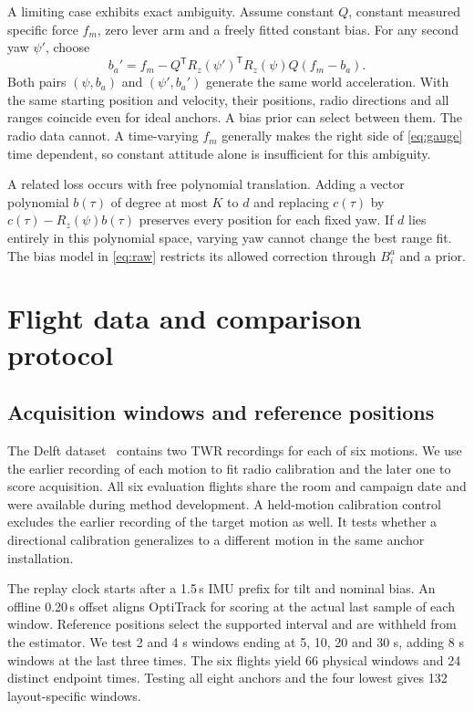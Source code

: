 \documentclass{IEEEtaes}
\newcommand{\rz}{R_z}
\newcommand{\trans}{^{\mathsf T}}
\begin{document}
A limiting case exhibits exact ambiguity. Assume constant \(Q\), constant measured specific force \(f_m\), zero lever arm and a freely fitted constant bias. For any second yaw \(\psi'\), choose
\begin{equation}
 b_a'=f_m-Q\trans\rz(\psi')\trans\rz(\psi)Q(f_m-b_a).
 \label{eq:gauge}
\end{equation}
Both pairs \((\psi,b_a)\) and \((\psi',b_a')\) generate the same world acceleration. With the same starting position and velocity, their positions, radio directions and all ranges coincide even for ideal anchors. A bias prior can select between them. The radio data cannot. A time-varying \(f_m\) generally makes the right side of \eqref{eq:gauge} time dependent, so constant attitude alone is insufficient for this ambiguity.

A related loss occurs with free polynomial translation. Adding a vector polynomial \(b(\tau)\) of degree at most \(K\) to \(d\) and replacing \(c(\tau)\) by \(c(\tau)-\rz(\psi)b(\tau)\) preserves every position for each fixed yaw. If \(d\) lies entirely in this polynomial space, varying yaw cannot change the best range fit. The bias model in \eqref{eq:raw} restricts its allowed correction through \(B_i^a\) and a prior.

\section{Flight data and comparison protocol}\label{sec:protocol}
\subsection{Acquisition windows and reference positions}
The Delft dataset~\cite{delftdata} contains two TWR recordings for each of six motions. We use the earlier recording of each motion to fit radio calibration and the later one to score acquisition. All six evaluation flights share the room and campaign date and were available during method development. A held-motion calibration control excludes the earlier recording of the target motion as well. It tests whether a directional calibration generalizes to a different motion in the same anchor installation.

The replay clock starts after a 1.5\,s IMU prefix for tilt and nominal bias. An offline 0.20\,s offset aligns OptiTrack for scoring at the actual last sample of each window. Reference positions select the supported interval and are withheld from the estimator. We test 2 and 4 s windows ending at 5, 10, 20 and 30 s, adding 8 s windows at the last three times. The six flights yield 66 physical windows and 24 distinct endpoint times. Testing all eight anchors and the four lowest gives 132 layout-specific windows.
\end{document}
